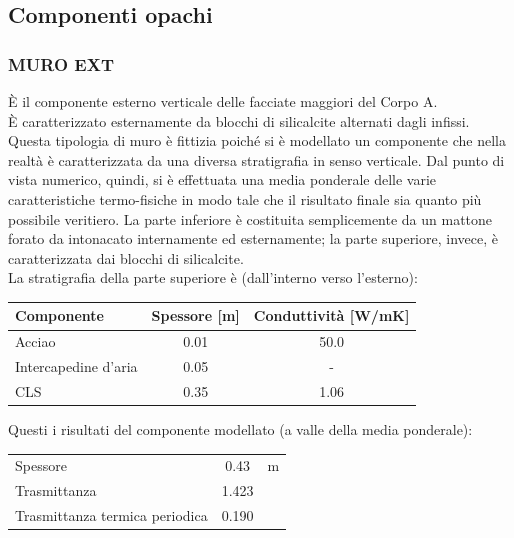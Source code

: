 \subsection{Componenti opachi}
\subsubsection{MURO EXT}
È il componente esterno verticale delle facciate maggiori del Corpo A. \\È caratterizzato esternamente da blocchi di silicalcite alternati dagli infissi. \\Questa tipologia di muro è fittizia poiché si è modellato un componente che nella realtà è caratterizzata da una diversa stratigrafia in senso verticale. Dal punto di vista numerico, quindi, si è effettuata una media ponderale delle varie caratteristiche termo-fisiche in modo tale che il risultato finale sia quanto più possibile veritiero. La parte inferiore è costituita semplicemente da un mattone forato da  intonacato internamente ed esternamente; la parte superiore, invece, è caratterizzata dai blocchi di silicalcite. \\ La stratigrafia della parte superiore è (dall'interno verso l'esterno):
\begin{center}
	\begin{tabular}{lcc}
		\toprule
		Componente & Spessore [m] & Conduttività [\si{W/mK}] \\
		\midrule
		Acciao & \num{0.01} & \num{50.0} \\
		Intercapedine d'aria & \num{0.05} & -\\
		CLS & \num{0.35} & \num{1.06} \\
		\bottomrule
	\end{tabular}
\end{center}
Questi i risultati del componente modellato (a valle della media ponderale):
\begin{center}
	\begin{tabular}{lcc}
		\toprule
		Spessore & \num{0.43} & \si{m}\\
		Trasmittanza & \num{1.423} & \trasm\\
		Trasmittanza termica periodica & \num{0.190} & \trasm\\
		\bottomrule
	\end{tabular}
\end{center}
\newpage
